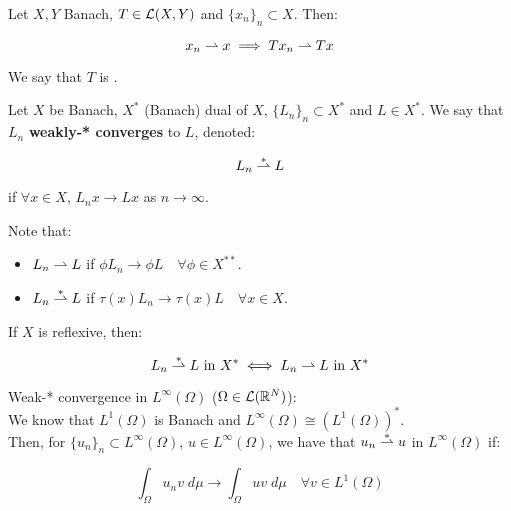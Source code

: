 \vspace{1em}

\begin{fproposition}
    Let $X, Y$ Banach, $T \in \mathcal{L}(X, Y)$ and $\{x_n\}_n \subset X$. Then:

    $$x_n \rightharpoonup x \implies T x_n \rightharpoonup T x$$

    We say that $T$ is .
\end{fproposition}

\vspace{1em}

\begin{fdefinition}
    Let $X$ be Banach, $X^*$ (Banach) dual of $X$, $\{L_n\}_n \subset X^*$ and $L \in X^*$.
    We say that $L_n$ \textbf{weakly-* converges} to $L$, denoted:

    $$L_n \overset{*}{\rightharpoonup} L$$

    if $\forall x \in X$, $L_n x \to Lx$ as $n \to \infty$.
\end{fdefinition}

\begin{fremark}
    Note that:
    \vspace{1em}
    \begin{itemize}
        \item $L_n \rightharpoonup L$ if $\phi L_n \to \phi L \quad \forall \phi \in X^{**}$.
        \vspace{1em}
        \item $L_n \overset{*}{\rightharpoonup} L$ if $\tau(x) L_n \to \tau(x) L \quad \forall x \in X$.
    \end{itemize}
\end{fremark}

\vspace{1em}

\begin{fproposition}
    If $X$ is reflexive, then:

    $$L_n \overset{*}{\rightharpoonup} L \text{ in } X^* \iff L_n \rightharpoonup L \text{ in } X^*$$
\end{fproposition}

\begin{fexample}
    Weak-* convergence in $L^{\infty}(\Omega)$ ($\Omega \in \mathcal{L}(\mathbb{R}^N)$):\\

    We know that $L^1(\Omega)$ is Banach and $L^{\infty}(\Omega) \cong (L^1(\Omega))^*$.\\
    Then, for $\{u_n\}_n \subset L^{\infty}(\Omega)$, $u \in L^{\infty}(\Omega)$, we have that
    $u_n \overset{*}{\rightharpoonup} u$ in $L^{\infty}(\Omega)$ if:

    $$\int_{\Omega} u_n v \; d \mu \to \int_{\Omega} u v \; d \mu \quad \forall v \in L^1(\Omega)$$
\end{fexample}


